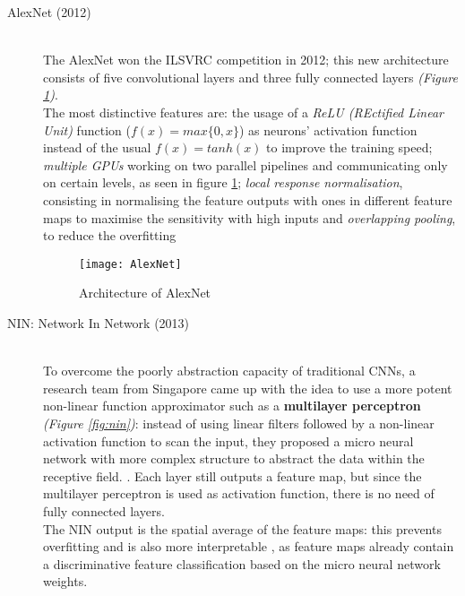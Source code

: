 \documentclass[../main.tex]{subfiles}
\begin{document}
\vspace*{5mm}
\begin{description}
\item[AlexNet (2012)] \cite{Krizhevsky2012} \hfill \\
The AlexNet won the ILSVRC competition in 2012; this new architecture consists of five convolutional layers and three fully connected layers \textit{(Figure \ref{fig:alexnet})}.\\
The most distinctive features are: the usage of a \textit{ReLU (REctified Linear Unit)} function ($f(x)=max\{0,x\}$) as neurons' activation function instead of the usual $f(x)=tanh(x)$ to improve the training speed; \textit{multiple GPUs} working on two parallel pipelines and communicating only on certain levels, as seen in figure \ref{fig:alexnet}; \textit{local response normalisation}, consisting in normalising the feature outputs with ones in different feature maps to maximise the sensitivity with high inputs and \textit{overlapping pooling}, to reduce the overfitting \cite{Krizhevsky2012} %

\vspace*{7mm}
\begin{figure}[H]
  \centering
  \texttt{[image: AlexNet]}
  \caption{Architecture of AlexNet \cite{Krizhevsky2012}}
  \label{fig:alexnet}
\end{figure}
\clearpage
\newpage


\vspace*{5mm}
\item[NIN: Network In Network (2013)] \cite{Lin2013} \hfill \\ 
To overcome the poorly abstraction capacity of traditional CNNs, a research team from Singapore came up with the idea to use a more potent non-linear function approximator such as a \textbf{multilayer perceptron} \textit{(Figure \ref{fig:nin})}: instead of using linear filters followed by a non-linear activation function to scan the input, they proposed a micro neural network with more complex structure to abstract the data within the receptive field. \cite{Lin2013}. Each layer still outputs a feature map, but since the multilayer perceptron is used as activation function, there is no need of fully connected layers. \\ The NIN output is the spatial average of the feature maps: this prevents overfitting and is also more interpretable \cite{Lin2013}, as feature maps already contain a discriminative feature classification based on the micro neural network weights. \\


\end{description}
\end{document}
